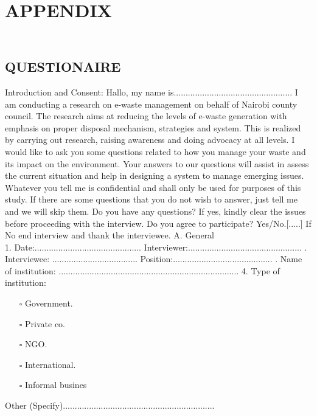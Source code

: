 \documentclass{article}
\begin{document}
\section{APPENDIX}
\subsection{\\QUESTIONAIRE}
Introduction and Consent:
\newline
\newline
Hallo, my name is.................................................. I am conducting a research on e-waste management on behalf of Nairobi county council. The research aims at reducing the levels of e-waste generation with emphasis on  proper disposal mechanism, strategies and system. This is realized by carrying out research, raising awareness and doing advocacy at all levels.
 I would like to ask you some questions related to how you manage your waste and its impact on the environment. Your answers to our questions will assist in assess the current situation and help in designing a system to manage emerging issues. Whatever you tell me is confidential and shall only be used for purposes of this study. If there are some questions that you do not wish to answer, just tell me and we will skip them. Do you have any questions? If yes, kindly clear the issues before proceeding with the interview.
Do you agree to participate? Yes/No.[.....] If No end interview and thank the interviewee.
\newline
\newline
 A. General\\
1. Date:............................................. Interviewer:................................................
. Interviewee: .................................... Position:..........................................
. Name of institution: ............................................................................
4. Type of institution:
\begin{itemize}
\item[$\square$] Government.
\item[$\square$]  Private co.
\item[$\square$]  NGO.
\item[$\square$] International.
\item[$\square$]   Informal busines
\end{itemize}
Other (Specify)................................................................
\end{document}
